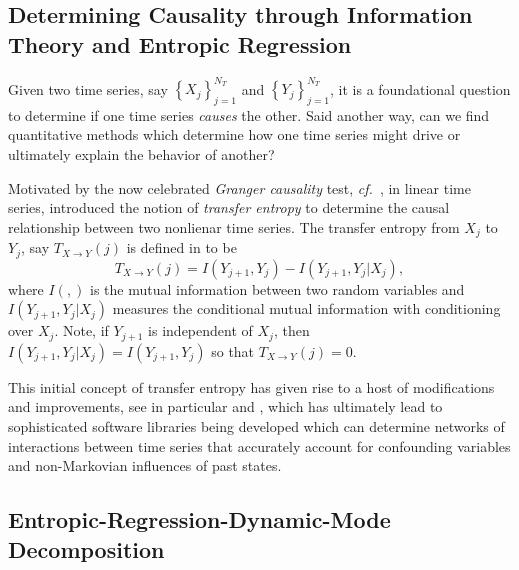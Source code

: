 \documentclass[a4paper,11pt]{article}
\newcommand{\cf}{{\it cf.}~}
\begin{document}
\subsection{Determining Causality through Information Theory and Entropic Regression}

Given two time series, say $\left\{X_{j}\right\}_{j=1}^{N_{T}}$ and $\left\{Y_{j}\right\}_{j=1}^{N_{T}}$, it is a foundational question to determine if one time series {\it causes} the other.  Said another way, can we find quantitative methods which determine how one time series might drive or ultimately explain the behavior of another?  

Motivated by the now celebrated {\it Granger causality} test, \cf \cite{granger}, in linear time series, \cite{schreiber} introduced the notion of {\it transfer entropy} to determine the causal relationship between two nonlienar time series.  The transfer entropy from $X_{j}$ to $Y_{j}$, say $T_{X\rightarrow Y}(j)$ is defined in \cite{schreiber} to be 
\[
T_{X\rightarrow Y}(j) = I(Y_{j+1},Y_{j}) - I(Y_{j+1},Y_{j}|X_{j}),  
\]
where $I(,)$ is the mutual information between two random variables and $I(Y_{j+1},Y_{j}|X_{j})$ measures the conditional mutual information with conditioning over $X_{j}$.  Note, if $Y_{j+1}$ is independent of $X_{j}$, then $I(Y_{j+1},Y_{j}|X_{j}) = I(Y_{j+1},Y_{j})$ so that $T_{X\rightarrow Y}(j) = 0$.  

This initial concept of transfer entropy has given rise to a host of modifications and improvements, see in particular \cite{faes} and \cite{bollt}, which has ultimately lead to sophisticated software libraries being developed which can determine networks of interactions between time series that accurately account for confounding variables and non-Markovian influences of past states.  

\subsection{Entropic-Regression-Dynamic-Mode Decomposition}
\end{document}
